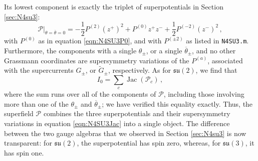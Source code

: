 \documentclass[12pt]{article}
\numberwithin{equation}{section}
\numberwithin{figure}{section}
\theoremstyle{plain}
\theoremstyle{definition}
\begin{document}
Its lowest component is exactly the triplet of superpotentials in Section \ref{sec:N4su3}:
\begin{equation}
    \mathcal{P} \big|_{\theta = \overline{\theta} = 0} = -\frac{1}{2} P^{(2)} (z^+)^2 + P^{(0)} z^+ z^- + \frac{1}{2} P^{(-2)} (z^-)^2 \,,
\end{equation}
with $P^{(0)}$ as in equation \eqref{eqn:N4SU3P0}, and with $P^{(\pm 2)}$ as listed in {\tt N4SU3.m}. Furthermore, the components with a single $\theta_\pm$, or a single $\overline{\theta}_\pm$, and no other Grassmann coordinates are supersymmetry variations of the $P^{(a)}$, associated with the supercurrents $G_\pm$, or $\widetilde{G}_\pm$, respectively. As for $\mathfrak{su}(2)$, we find that
\begin{equation}\label{eqn:N4superJac}
    I_0 = \sum_c \operatorname{Jac}(\mathcal{P}_c) \,,
\end{equation}
where the sum runs over all of the components of $\mathcal{P}$, including those involving more than one of the $\theta_\pm$ and $\overline{\theta}_\pm$; we have verified this equality exactly. Thus, the superfield $\mathcal{P}$ combines the three superpotentials and their supersymmetry variations in equation \eqref{eqn:N4SU3Jac} into a single object. The difference between the two gauge algebras that we observed in Section \ref{sec:N4su3} is now transparent: for $\mathfrak{su}(2)$, the superpotential has spin zero, whereas, for $\mathfrak{su}(3)$, it has spin one.
\end{document}
